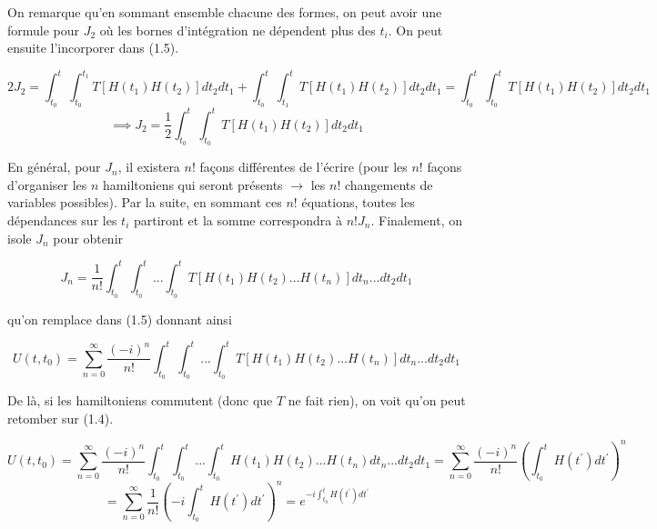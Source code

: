 On remarque qu'en sommant ensemble chacune des formes, on peut avoir une formule pour $J_2$ où les bornes d'intégration ne dépendent plus des $t_i$. On peut ensuite l'incorporer dans (1.5).

\begin{equation*}
    2J_2 = \int_{t_0}^{t}\int_{t_0}^{t_1}T\left[H(t_1)H(t_2)\right]dt_2dt_1 + \int_{t_0}^{t}\int_{t_1}^{t}T\left[H(t_1)H(t_2)\right]dt_2dt_1 = \int_{t_0}^{t}\int_{t_0}^{t}T\left[H(t_1)H(t_2)\right]dt_2dt_1
\end{equation*}
\begin{equation}
    \implies J_2 = \frac{1}{2}\int_{t_0}^{t}\int_{t_0}^{t}T\left[H(t_1)H(t_2)\right]dt_2dt_1 
\end{equation}

En général, pour $J_n$, il existera $n!$ façons différentes de l'écrire (pour les $n!$ façons d'organiser les $n$ hamiltoniens qui seront présents $\rightarrow$ les $n!$ changements de variables possibles). Par la suite, en sommant ces $n!$ équations, toutes les dépendances sur les $t_i$ partiront et la somme correspondra à $n!J_n$. Finalement, on isole $J_n$ pour obtenir 

\begin{equation}
    J_n = \frac{1}{n!}\int_{t_0}^{t}\int_{t_0}^{t}...\int_{t_0}^{t} T \left[H(t_1)H(t_2)...H(t_n)\right]dt_n ... dt_2 dt_1
\end{equation}

qu'on remplace dans (1.5) donnant ainsi

\begin{equation*}
    U(t,t_0) = \sum_{n=0}^{\infty}\frac{(-i)^n}{n!}\int_{t_0}^{t}\int_{t_0}^{t}...\int_{t_0}^{t} T \left[H(t_1)H(t_2)...H(t_n)\right]dt_n ... dt_2 dt_1
\end{equation*}

De là, si les hamiltoniens commutent (donc que $T$ ne fait rien), on voit qu'on peut retomber sur (1.4).

\begin{equation*}
    U(t,t_0) = \sum_{n=0}^{\infty}\frac{(-i)^n}{n!}\int_{t_0}^{t}\int_{t_0}^{t}...\int_{t_0}^{t}H(t_1)H(t_2)...H(t_n)dt_n ... dt_2 dt_1 = \sum_{n=0}^{\infty}\frac{(-i)^n}{n!}\left(\int_{t_0}^{t}H(t^{'})dt^{'}\right)^n
\end{equation*}
\begin{equation*}
    = \sum_{n=0}^{\infty}\frac{1}{n!}\left(-i\int_{t_0}^{t}H(t^{'})dt^{'}\right)^n = e^{-i\int_{t_0}^{t}H(t^{'})dt^{'}}
\end{equation*}

